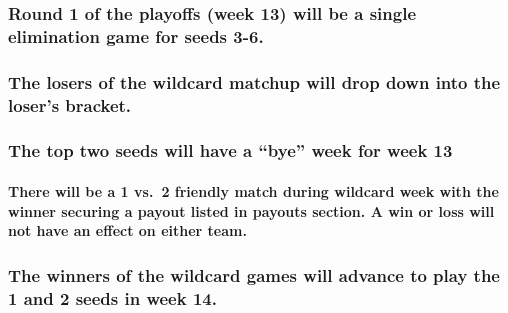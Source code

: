 \documentclass[
]{book}
\begin{document}
\hypertarget{round-1-of-the-playoffs-week-13-will-be-a-single-elimination-game-for-seeds-3-6.}{%
\subsubsection{Round 1 of the playoffs (week 13) will be a single elimination game for seeds 3-6.}\label{round-1-of-the-playoffs-week-13-will-be-a-single-elimination-game-for-seeds-3-6.}}

\hypertarget{the-losers-of-the-wildcard-matchup-will-drop-down-into-the-losers-bracket.}{%
\subsubsection{The losers of the wildcard matchup will drop down into the loser's bracket.}\label{the-losers-of-the-wildcard-matchup-will-drop-down-into-the-losers-bracket.}}

\hypertarget{the-top-two-seeds-will-have-a-bye-week-for-week-13}{%
\subsubsection{The top two seeds will have a ``bye'' week for week 13}\label{the-top-two-seeds-will-have-a-bye-week-for-week-13}}

\hypertarget{there-will-be-a-1-vs.-2-friendly-match-during-wildcard-week-with-the-winner-securing-a-payout-listed-in-payouts-section.-a-win-or-loss-will-not-have-an-effect-on-either-team.}{%
\paragraph{There will be a 1 vs.~2 friendly match during wildcard week with the winner securing a payout listed in payouts section. A win or loss will not have an effect on either team.}\label{there-will-be-a-1-vs.-2-friendly-match-during-wildcard-week-with-the-winner-securing-a-payout-listed-in-payouts-section.-a-win-or-loss-will-not-have-an-effect-on-either-team.}}

\hypertarget{the-winners-of-the-wildcard-games-will-advance-to-play-the-1-and-2-seeds-in-week-14.}{%
\subsubsection{The winners of the wildcard games will advance to play the 1 and 2 seeds in week 14.}\label{the-winners-of-the-wildcard-games-will-advance-to-play-the-1-and-2-seeds-in-week-14.}}
\end{document}
